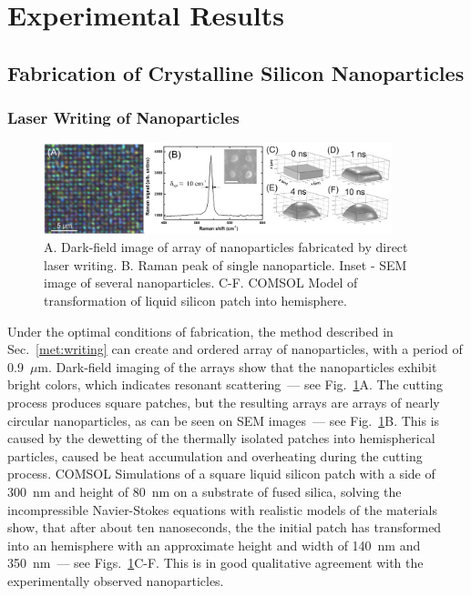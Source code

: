 \section{Experimental Results}
    \subsection{Fabrication of Crystalline Silicon Nanoparticles}
        \label{sec:Fabrication}

        \subsubsection{Laser Writing of Nanoparticles}

            \begin{figure}[!ht]
                    \begin{center}
                        \includegraphics[width=0.9\textwidth]{figs/results/fab/LaserWriting.eps}
                    \end{center}
                    \caption{A. Dark-field image of array of nanoparticles fabricated by direct laser writing. B. Raman peak of single nanoparticle. Inset - SEM image
                    of several nanoparticles. C-F. COMSOL Model of transformation of liquid silicon patch into hemisphere.}
                    \label{fig:LaserWriting}
            \end{figure}

                Under the optimal conditions of fabrication, the method described in Sec.~\ref{met:writing}
            can create and ordered array of nanoparticles, with a period of 0.9~$\mu$m. Dark-field imaging of the arrays show that
            the nanoparticles exhibit bright colors, which indicates resonant scattering~--- see Fig.~\ref{fig:LaserWriting}A.
            The cutting process produces square patches, but the resulting arrays are arrays of nearly circular nanoparticles, as can be
            seen on SEM images~--- see Fig.~\ref{fig:LaserWriting}B. This is caused by the dewetting of the thermally isolated patches into
            hemispherical particles, caused be heat accumulation and overheating during the cutting process. COMSOL Simulations of a
            square liquid silicon patch with a side of 300~nm and height of 80~nm on a substrate of fused silica, solving the incompressible
            Navier-Stokes equations with realistic models of the materials show, that after about ten nanoseconds, the the initial patch has
            transformed into an hemisphere with an approximate height and width of 140~nm and 350~nm~--- see Figs.~\ref{fig:LaserWriting}C-F.
            This is in good qualitative agreement with the experimentally observed nanoparticles.

